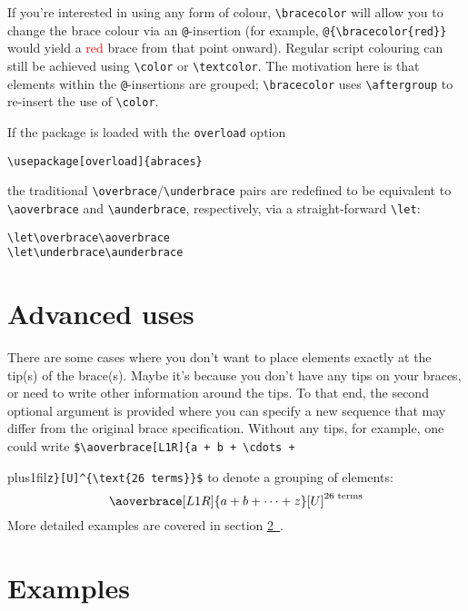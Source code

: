 \documentclass[10pt]{ltxdockit}[2011/03/25]
\newcommand{\parnopar}[1][]{\parfillskip=0pt\par%
  #1%
  \parskip=0pt\noindent\parfillskip=0pt plus1fil}
\begin{document}
\begin{ltxsyntax}


\end{ltxsyntax}

If you're interested in using any form of colour, \lstinline|\bracecolor| will allow you to change the brace colour via an \lstinline!@!-insertion (for example, \lstinline!@{\bracecolor{red}}! would yield a \textcolor{red}{red} brace from that point onward). Regular script colouring can still be achieved using \lstinline!\color! or \lstinline!\textcolor!. The motivation here is that elements within the \lstinline!@!-insertions are grouped; \lstinline!\bracecolor! uses \lstinline!\aftergroup! to re-insert the use of \lstinline!\color!.

If the package is loaded with the \lstinline!overload! option
\begin{lstlisting}
\usepackage[overload]{abraces}
\end{lstlisting}
the traditional \lstinline!\overbrace!/\lstinline!\underbrace! pairs are redefined to be equivalent to \lstinline!\aoverbrace! and \lstinline!\aunderbrace!, respectively, via a straight-forward \lstinline!\let!:
\begin{lstlisting}
\let\overbrace\aoverbrace
\let\underbrace\aunderbrace
\end{lstlisting}

\section{Advanced uses} \label{sec:advanced-interface}

There are some cases where you don't want to place elements exactly at the tip(s) of the brace(s). Maybe it's because you don't have any tips on your braces, or need to write other information around the tips. To that end, the second optional  argument is provided where you can specify a new sequence that may differ from the original brace specification. Without any tips, for example, one could write \lstinline!$\aoverbrace[L1R]{a + b + \cdots +!\parnopar\lstinline!z}[U]^{\text{26 terms}}$! to denote a grouping of elements:
\[
  \aoverbrace[L1R]{a + b + \cdots + z}[U]^{\text{26 terms}}
\]
More detailed examples are covered in section \hyperref[sec:examples]{\ref*{sec:examples}~}.

\section{Examples} \label{sec:examples}
\end{document}
